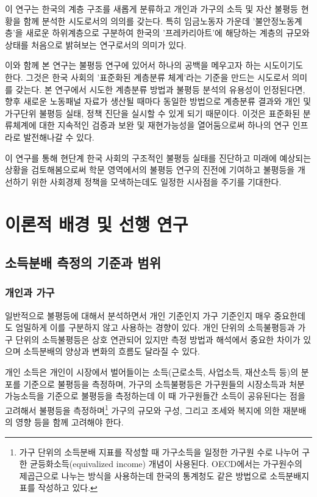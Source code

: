\documentclass[
  letterpaper,
  DIV=11,
  numbers=noendperiod]{scrartcl}
\begin{document}
이 연구는 한국의 계층 구조를 새롭게 분류하고 개인과 가구의 소득 및 자산
불평등 현황을 함께 분석한 시도로서의 의의를 갖는다. 특히 임금노동자
가운데 '불안정노동계층'을 새로운 하위계층으로 구분하여 한국의
'프레카리아트'에 해당하는 계층의 규모와 상태를 처음으로 밝혀보는
연구로서의 의미가 있다.

이와 함께 본 연구는 불평등 연구에 있어서 하나의 공백을 메우고자 하는
시도이기도 한다. 그것은 한국 사회의 '표준화된 계층분류 체계'라는 기준을
만드는 시도로서 의미를 갖는다. 본 연구에서 시도한 계층분류 방법과 불평등
분석의 유용성이 인정된다면, 향후 새로운 노동패널 자료가 생산될 때마다
동일한 방법으로 계층분류 결과와 개인 및 가구단위 불평등 실태, 정책
진단을 실시할 수 있게 되기 때문이다. 이것은 표준화된 분류체계에 대한
지속적인 검증과 보완 및 재현가능성을 열어둠으로써 하나의 연구 인프라로
발전해나갈 수 있다.

이 연구를 통해 현단계 한국 사회의 구조적인 불평등 실태를 진단하고 미래에
예상되는 상황을 검토해봄으로써 학문 영역에서의 불평등 연구의 진전에
기여하고 불평등을 개선하기 위한 사회경제 정책을 모색하는데도 일정한
시사점을 주기를 기대한다.

\section{이론적 배경 및 선행
연구}\label{uxc774uxb860uxc801-uxbc30uxacbd-uxbc0f-uxc120uxd589-uxc5f0uxad6c}

\subsection{소득분배 측정의 기준과
범위}\label{uxc18cuxb4dduxbd84uxbc30-uxce21uxc815uxc758-uxae30uxc900uxacfc-uxbc94uxc704}

\subsubsection{개인과 가구}\label{uxac1cuxc778uxacfc-uxac00uxad6c}

일반적으로 불평등에 대해서 분석하면서 개인 기준인지 가구 기준인지 매우
중요한데도 엄밀하게 이를 구분하지 않고 사용하는 경향이 있다. 개인 단위의
소득불평등과 가구 단위의 소득불평등은 상호 연관되어 있지만 측정 방법과
해석에서 중요한 차이가 있으며 소득분배의 양상과 변화의 흐름도 달라질 수
있다.

개인 소득은 개인이 시장에서 벌어들이는 소득(근로소득, 사업소득, 재산소득
등)의 분포를 기준으로 불평등을 측정하며, 가구의 소득불평등은 가구원들의
시장소득과 처분가능소득을 기준으로 불평등을 측정하는데 이 때 가구원들간
소득이 공유된다는 점을 고려해서 불평등을 측정하며\footnote{가구 단위의
  소득분배 지표를 작성할 때 가구소득을 일정한 가구원 수로 나누어 구한
  균등화소득(equivalized income) 개념이 사용된다. OECD에서는 가구원수의
  제곱근으로 나누는 방식을 사용하는데 한국의 통계청도 같은 방법으로
  소득분배지표를 작성하고 있다.} 가구의 규모와 구성, 그리고 조세와
복지에 의한 재분배의 영향 등을 함께 고려해야 한다.
\end{document}
